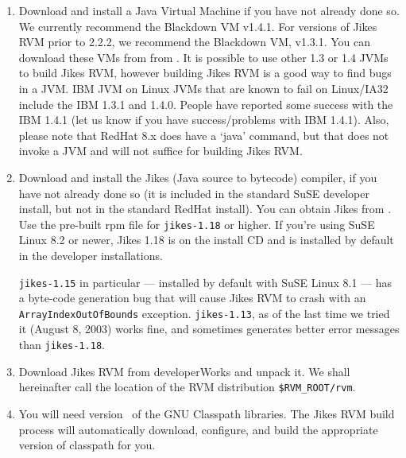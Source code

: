 \begin{enumerate}

\item Download and install a Java Virtual Machine if you have not
already done so.  We currently recommend the Blackdown VM v1.4.1. 
For versions of Jikes RVM prior to 2.2.2, we recommend
the Blackdown VM, v1.3.1.  You can download these VMs from 
from \xlink{{\tt \BlackdownURL}} {\BlackdownURL}. 
It is possible to use other 1.3 or 1.4 JVMs to build Jikes RVM,
however building Jikes RVM is a good way to find bugs in a JVM.
{\index IBM JVM on Linux}
JVMs that are known to fail on Linux/IA32 include the IBM 1.3.1 and
1.4.0.  People have reported some success with the IBM 1.4.1 (let us
know if you have success/problems with IBM 1.4.1). Also, please note
that RedHat 8.x does have a `java' command, but that does not invoke a
JVM and will not suffice for building Jikes RVM.

\item Download and install the Jikes (Java source to bytecode)
compiler, if you have not already 
done so (it is included in the standard SuSE developer install, but not in
the standard RedHat install).  You can 
obtain Jikes from .
Use the pre-built rpm file for {\tt jikes-1.18} or higher.   
If you're using SuSE Linux 8.2 or newer, Jikes 1.18 is on the install
CD and is installed by default in the developer installations. 


{\tt jikes-1.15} in
particular --- installed by default with SuSE Linux 8.1 --- has a
byte-code generation bug that will cause Jikes RVM to crash with an
{\tt ArrayIndexOutOfBounds} exception.  {\tt jikes-1.13}, as of the last
time we tried it (August 8, 2003) works fine, and sometimes generates
better error messages than {\tt jikes-1.18}.

\item Download Jikes RVM from developerWorks and unpack it.  We shall
hereinafter call the location of the RVM distribution {\tt \$RVM\_ROOT/rvm}.

\item You will need version \classpathversion\ of the GNU Classpath
libraries. The Jikes RVM build process will automatically download, 
configure, and build  the appropriate version of classpath for you.


\end{enumerate}
